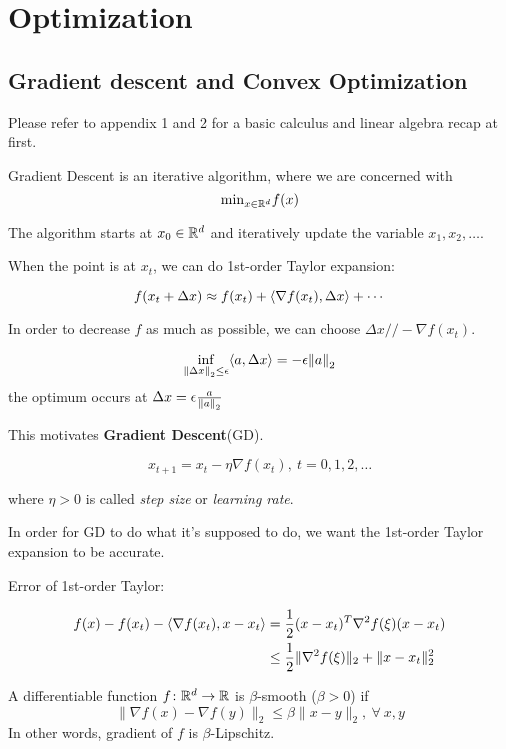\part{Optimization}


\chapter{Gradient descent and Convex Optimization}
Please refer to appendix 1 and 2 for a basic calculus and linear algebra recap at first. 



Gradient Descent is an iterative algorithm, where we are concerned with 
\[
   \text{min}_{x \in \mathbb{R}^d} f(x)  
\]

The algorithm starts at \(x_0 \in \mathbb{R}^d\) and iteratively update the variable 
\(x_1, x_2, \ldots\). 

When the point is at \(x_t\), we can do 1st-order Taylor expansion: 

\[
    f(x_t + \Delta x) \approx f(x_t) + \langle \nabla f(x_t),  \Delta x \rangle + \cdots 
\]


In order to decrease \(f\) as much as possible, we can choose \(\Delta x // - \nabla f(x_t)\). 

\begin{remark}
    \[
        \inf_{\norm{\Delta x}_2 \leq \epsilon} \langle a, \Delta x \rangle = - \epsilon \norm{a}_2  
    \]
    the optimum occurs at \(\Delta x = \epsilon \frac{a}{\norm{a}_2}\)
\end{remark}


This motivates \textbf{Gradient Descent}(GD). 

\[
    x_{t+1} = x_t - \eta \nabla f(x_t), \ t = 0,1,2,\ldots
\]

where \(\eta > 0\) is called \emph{step size} or \emph{learning rate}. 

In order for GD to do what it's supposed to do, we want the 1st-order Taylor expansion to be 
accurate. 

Error of 1st-order Taylor: 


\begin{align*}
    f(x) - f(x_t) -  \langle \nabla f(x_t), x - x_t \rangle &= \frac{1}{2} (x - x_t)^T \nabla^2 f(\xi) (x - x_t) \\ 
    & \leq \frac{1}{2} \lVert \nabla^2 f(\xi)\rVert_2 + \lVert x - x_t\rVert_2^2
\end{align*}

\begin{definition}[smoothness]
    A differentiable function \(f \colon \mathbb{R}^d \to \mathbb{R}\) is \(\beta\)-smooth (\(\beta > 0\)) if 
    \[
        \lVert \nabla f(x) - \nabla f(y)\rVert_2 \leq \beta\lVert x - y\rVert_2, \ \forall \ x, y   
    \]
    In other words, gradient of \(f\) is \(\beta\)-Lipschitz. 
\end{definition}

